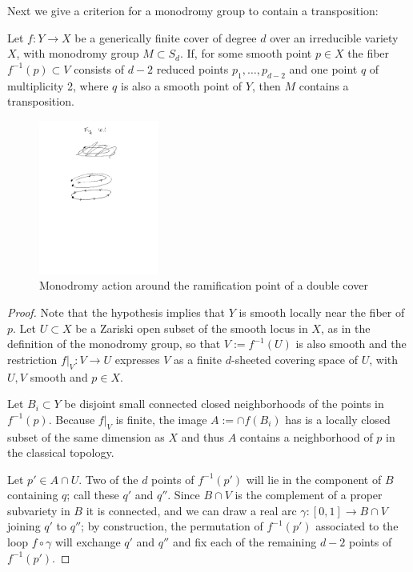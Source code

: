 Next we give a criterion for a monodromy group to contain a transposition:

\begin{lemma}\label{transposition lemma}
Let $f : Y \to X$ be a generically finite cover of degree $d$ over an irreducible variety $X$, with  monodromy group $M \subset S_d$.  
If,  for some smooth point $p \in X$ the fiber $f^{-1}(p)\subset V$ consists of $d-2$ reduced points $p_1,\dots, p_{d-2}$ and one point $q$ of multiplicity 2, where $q$ is also a smooth point of $Y$, then $M$ contains a transposition.
\end{lemma}

\begin{figure}
\begin{center}
\centerline {\includegraphics[height=2in]{"Fig10.1.pdf"}}
\caption{Monodromy action around the ramification point of a double cover}
\label{default}
\end{center}
\end{figure}

\begin{proof} Note that the hypothesis implies that $Y$ is smooth
locally near the fiber of $p$. Let $U \subset X$ be a Zariski open subset of the smooth locus in $X$, as in the definition of the monodromy group, so that  $V := f^{-1}(U)$ is also smooth and the restriction $f|_V : V \to U$ expresses $V$ as a finite $d$-sheeted covering space of $U$, with $U,V$ smooth and $p\in X$.

Let $B_i\subset Y$ be disjoint small connected closed neighborhoods of the points
in $f^{-1}(p)$. Because $f|_V$  is finite, the image $A := \cap f(B_i)$ has is a locally
closed subset of the same dimension as $X$ and thus $A$
 contains a neighborhood
of $p$ in the classical topology.

Let $p' \in A \cap U$. Two of the $d$ points of $f^{-1}(p')$ will lie in the component  of $B$ containing $q$; call these $q'$ and $q''$. Since $B \cap V$ is the complement of a proper subvariety in $B$ it is connected, and we can draw a real arc $\gamma : [0,1] \to B \cap V$ joining $q'$ to $q''$; by construction, the permutation of $f^{-1}(p')$ associated to the loop $f \circ \gamma$ will exchange $q'$ and $q''$ and fix each of the remaining $d-2$ points of $f^{-1}(p')$.
\end{proof}


